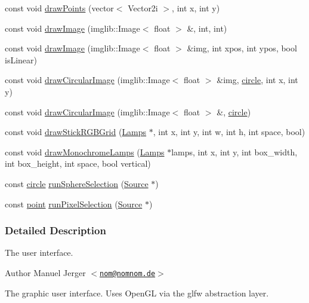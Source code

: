 \begin{DoxyCompactItemize}
const void \hyperlink{classGui_a890eb7e15ebcd27442265750289c8a1c}{draw\-Points} (vector$<$ \-Vector2i $>$, int x, int y)
\item 
const void \hyperlink{classGui_a2ed9c555b5222b97051925a05bfafe07}{draw\-Image} (imglib\-::\-Image$<$ float $>$ \&, int, int)
\item 
const void \hyperlink{classGui_abc6b714f3cb3071178896c53966ba3a7}{draw\-Image} (imglib\-::\-Image$<$ float $>$ \&img, int xpos, int ypos, bool is\-Linear)
\item 
const void \hyperlink{classGui_ac4cd3095167790347e76b706d9c176ab}{draw\-Circular\-Image} (imglib\-::\-Image$<$ float $>$ \&img, \hyperlink{structcircle}{circle}, int x, int y)
\item 
const void \hyperlink{classGui_a341d87fe70343f149606787c1f6389e4}{draw\-Circular\-Image} (imglib\-::\-Image$<$ float $>$ \&, \hyperlink{structcircle}{circle})
\item 
const void \hyperlink{classGui_a9cfedb7c38c95fd99de96d48dc25053a}{draw\-Stick\-R\-G\-B\-Grid} (\hyperlink{classLamps}{\-Lamps} $\ast$, int x, int y, int w, int h, int space, bool)
\item 
const void \hyperlink{classGui_acce05435c1f43bcd80a2ed8ddc216a87}{draw\-Monochrome\-Lamps} (\hyperlink{classLamps}{\-Lamps} $\ast$lamps, int x, int y, int box\-\_\-width, int box\-\_\-height, int space, bool vertical)
\item 
const \hyperlink{structcircle}{circle} \hyperlink{classGui_a969a83c1a030acb4254e7b58afc4dff8}{run\-Sphere\-Selection} (\hyperlink{classSource}{\-Source} $\ast$)
\item 
const \hyperlink{structpoint}{point} \hyperlink{classGui_a81d08ecea8196f17a8514e7e70cd5970}{run\-Pixel\-Selection} (\hyperlink{classSource}{\-Source} $\ast$)
\end{DoxyCompactItemize}


\subsubsection{\-Detailed \-Description}
\-The user interface. 

\begin{DoxyAuthor}{\-Author}
\-Manuel \-Jerger $<$\href{mailto:nom@nomnom.de}{\tt nom@nomnom.\-de}$>$
\end{DoxyAuthor}
\-The graphic user interface. \-Uses \-Open\-G\-L via the glfw abstraction layer. 

